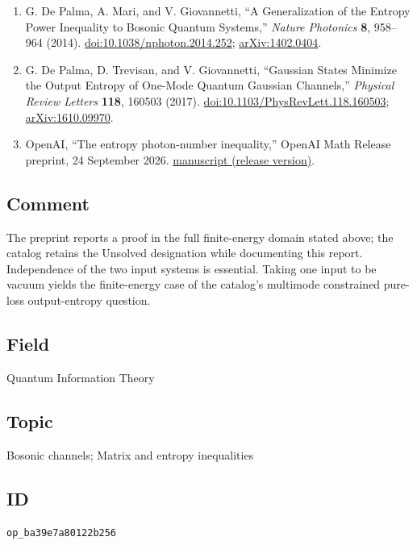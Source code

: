 \begin{enumerate}[label={},leftmargin=4.8em,labelsep=0.5em]
  \footnotesize
  \item[\textup{[DMG14]}]\label{ref:epni-qepi}
  G. De Palma, A. Mari, and V. Giovannetti, ``A Generalization of the Entropy Power Inequality to Bosonic Quantum Systems,'' \emph{Nature Photonics} \textbf{8}, 958--964 (2014). \href{https://doi.org/10.1038/nphoton.2014.252}{doi:10.1038/nphoton.2014.252}; \href{https://arxiv.org/abs/1402.0404}{arXiv:1402.0404}.

  \item[\textup{[DTG17]}]\label{ref:epni-one-mode}
  G. De Palma, D. Trevisan, and V. Giovannetti, ``Gaussian States Minimize the Output Entropy of One-Mode Quantum Gaussian Channels,'' \emph{Physical Review Letters} \textbf{118}, 160503 (2017). \href{https://doi.org/10.1103/PhysRevLett.118.160503}{doi:10.1103/PhysRevLett.118.160503}; \href{https://arxiv.org/abs/1610.09970}{arXiv:1610.09970}.

  \item[\textup{[OAI26]}]\label{ref:epni-openai}
  OpenAI, ``The entropy photon-number inequality,'' OpenAI Math Release preprint, 24 September 2026.
\href{https://github.com/openai/math/blob/adc7f1241b42e322a6451854ab7e4b4c146bf78a/preprints/The-entropy-photon-number-inequality-September-24-2026/paper.pdf}{manuscript (release version)}.
\end{enumerate}

\subsection*{Comment}

The preprint  reports a proof in the
  full finite-energy domain stated above; the catalog retains the Unsolved
  designation while documenting this report. Independence of the two input
  systems is essential. Taking one input to be vacuum yields the
  finite-energy case of the catalog's multimode constrained pure-loss
  output-entropy question.

\subsection*{Field}

Quantum Information Theory

\subsection*{Topic}

Bosonic channels; Matrix and entropy inequalities

\subsection*{ID}

\texttt{op\_ba39e7a80122b256}
